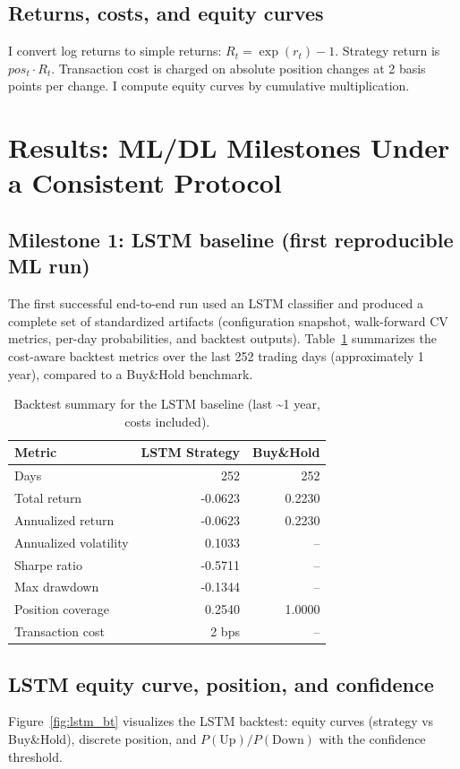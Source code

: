 \documentclass[letterpaper]{article} %
\begin{document}
\subsection{Returns, costs, and equity curves}
I convert log returns to simple returns: $R_t=\exp(r_t)-1$. Strategy return is $pos_t\cdot R_t$. Transaction cost is charged on absolute position changes at 2 basis points per change. I compute equity curves by cumulative multiplication.

\section{Results: ML/DL Milestones Under a Consistent Protocol}
\subsection{Milestone 1: LSTM baseline (first reproducible ML run)}
The first successful end-to-end run used an LSTM classifier and produced a complete set of standardized artifacts (configuration snapshot, walk-forward CV metrics, per-day probabilities, and backtest outputs). Table~\ref{tab:lstm_bt} summarizes the cost-aware backtest metrics over the last 252 trading days (approximately 1 year), compared to a Buy\&Hold benchmark.

\begin{table}[t]
\centering
\small
\begin{tabular}{lrr}
\hline
Metric & LSTM Strategy & Buy\&Hold \\
\hline
Days & 252 & 252 \\
Total return & -0.0623 & 0.2230 \\
Annualized return & -0.0623 & 0.2230 \\
Annualized volatility & 0.1033 & -- \\
Sharpe ratio & -0.5711 & -- \\
Max drawdown & -0.1344 & -- \\
Position coverage & 0.2540 & 1.0000 \\
Transaction cost & 2 bps & -- \\
\hline
\end{tabular}
\caption{Backtest summary for the LSTM baseline (last \textasciitilde1 year, costs included).}
\label{tab:lstm_bt}
\end{table}

\subsection{LSTM equity curve, position, and confidence}
Figure~\ref{fig:lstm_bt} visualizes the LSTM backtest: equity curves (strategy vs Buy\&Hold), discrete position, and $P(\text{Up})/P(\text{Down})$ with the confidence threshold.
\end{document}
